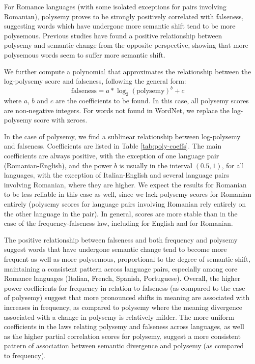 \documentclass[output=paper]{langsci/langscibook}
\begin{document}
For Romance languages (with some isolated exceptions for pairs involving Romanian), polysemy proves to be strongly positively correlated with falseness, suggesting words which have undergone more semantic shift tend to be more polysemous. Previous studies \citep{hamilton-etal-2016-diachronic} have found a positive relationship between polysemy and semantic change from the opposite perspective, showing that more polysemous words seem to suffer more semantic shift. 

We further compute a polynomial that approximates the relationship between the log-polysemy score and falseness, following the general form:
\begin{equation}
    \text{falseness} = a * \log_2(\text{polysemy})^b + c
\end{equation}
where $a$, $b$ and $c$ are the coefficients to be found. In this case, all polysemy scores are non-negative integers. For words not found in WordNet, we replace the log-polysemy score with zeroes.

In the case of polysemy, we find a sublinear relationship between log-po\-ly\-semy and falseness. Coefficients are listed in Table \ref{tab:poly-coeffs}.
The main coefficients are always positive, with the exception of one language pair (Romanian-English), and the power $b$ is usually in the interval $(0.5, 1)$, for all languages, with the exception of Italian-English and several language pairs involving Romanian, where they are higher. We expect the results for Romanian to be less reliable in this case as well, since we lack polysemy scores for Romanian entirely (polysemy scores for language pairs involving Romanian rely entirely on the other language in the pair). In general, scores are more stable than in the case of the frequency-falseness law, including for English and for Romanian.

The positive relationship between falseness and both frequency and polysemy suggest words that have undergone semantic change tend to become more frequent as well as more polysemous, proportional to the degree of semantic shift, maintaining a consistent pattern across language pairs, especially among core Romance languages (Italian, French, Spanish, Portuguese). Overall, the higher power coefficients for frequency in relation to falseness (as compared to the case of polysemy) suggest that more pronounced shifts in meaning are associated with increases in frequency, as compared to polysemy where the meaning divergence associated with a change in polysemy is relatively milder. The more uniform coefficients in the laws relating polysemy and falseness across languages, as well as the higher partial correlation scores for polysemy, suggest a more consistent pattern of association between semantic divergence and polysemy (as compared to frequency).
\end{document}
